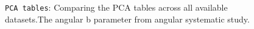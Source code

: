 \documentclass[12pt]{article}
\begin{document}
\begin{figure}
\centering
\noindent{}
  \caption{\centering \texttt{PCA tables}: Comparing the PCA tables across all available datasets.\hspace{\textwidth}The angular b parameter from angular systematic study.}
  \label{fig:min7}
\end{figure}
\end{document}
